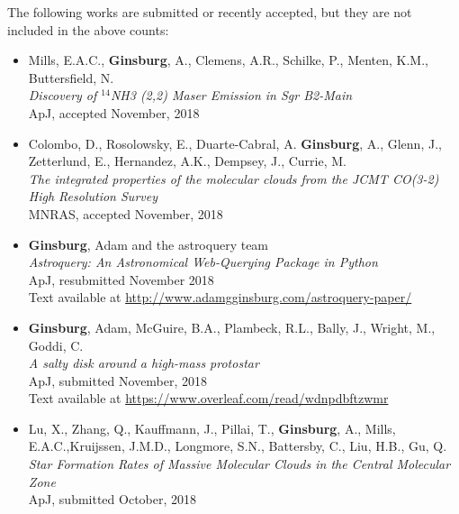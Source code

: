 \vspace{24pt}
The following works are submitted or recently accepted, but they are not included in the above counts:

\begin{itemize}
\item Mills, E.A.C., \textbf{Ginsburg}, A., Clemens, A.R., Schilke, P., Menten, K.M., Buttersfield, N. \\
    \textit{Discovery of $^{14}$NH3 (2,2) Maser Emission in Sgr B2-Main} \\
    ApJ, accepted November, 2018

\item Colombo, D.,   Rosolowsky, E., Duarte-Cabral, A. \textbf{Ginsburg}, A.,
    Glenn, J.,  Zetterlund, E., Hernandez, A.K., Dempsey, J., Currie, M. \\
    \textit{The integrated properties of the molecular clouds from the JCMT CO(3-2) High Resolution Survey} \\
    MNRAS, accepted November, 2018

    \item \textbf{Ginsburg}, Adam and the astroquery team \\
        \textit{Astroquery: An Astronomical Web-Querying Package in Python} \\
ApJ, resubmitted November 2018 \\ 
Text available at \url{http://www.adamgginsburg.com/astroquery-paper/}

    \item \textbf{Ginsburg}, Adam, McGuire, B.A., Plambeck, R.L., Bally, J., Wright, M., Goddi, C. \\
        \textit{A salty disk around a high-mass protostar} \\
ApJ, submitted November, 2018 \\
Text available at \url{https://www.overleaf.com/read/wdnpdbftzwmr} 

\item Lu, X., Zhang, Q., Kauffmann, J.,  Pillai, T.,  
    \textbf{Ginsburg}, A.,  Mills, E.A.C.,Kruijssen, J.M.D., 
    Longmore, S.N.,  Battersby, C.,   Liu, H.B.,  Gu, Q. \\
    \textit{Star Formation Rates of Massive Molecular Clouds in the Central Molecular Zone}\\
    ApJ, submitted October, 2018

    
\end{itemize}
